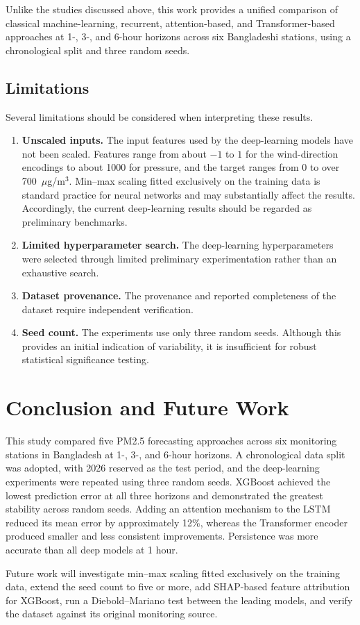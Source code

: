 \documentclass[conference]{IEEEtran}
\begin{document}
Unlike the studies discussed above, this work provides a unified comparison of classical machine-learning, recurrent, attention-based, and Transformer-based approaches at 1-, 3-, and 6-hour horizons across six Bangladeshi stations, using a chronological split and three random seeds.

\subsection{Limitations}\label{sec:limitations}
Several limitations should be considered when interpreting these results.

\begin{enumerate}
    \item \textbf{Unscaled inputs.} The input features used by the deep-learning models have not been scaled. Features range from about \(-1\) to \(1\) for the wind-direction encodings to about 1000 for pressure, and the target ranges from 0 to over 700~\(\mu\)g/m\(^3\). Min--max scaling fitted exclusively on the training data is standard practice for neural networks and may substantially affect the results. Accordingly, the current deep-learning results should be regarded as preliminary benchmarks.
    \item \textbf{Limited hyperparameter search.} The deep-learning hyperparameters were selected through limited preliminary experimentation rather than an exhaustive search.
    \item \textbf{Dataset provenance.} The provenance and reported completeness of the dataset require independent verification.
    \item \textbf{Seed count.} The experiments use only three random seeds. Although this provides an initial indication of variability, it is insufficient for robust statistical significance testing.
\end{enumerate}

\section{Conclusion and Future Work}
This study compared five PM2.5 forecasting approaches across six monitoring stations in Bangladesh at 1-, 3-, and 6-hour horizons. A chronological data split was adopted, with 2026 reserved as the test period, and the deep-learning experiments were repeated using three random seeds. XGBoost achieved the lowest prediction error at all three horizons and demonstrated the greatest stability across random seeds. Adding an attention mechanism to the LSTM reduced its mean error by approximately 12\%, whereas the Transformer encoder produced smaller and less consistent improvements. Persistence was more accurate than all deep models at 1 hour.

Future work will investigate min--max scaling fitted exclusively on the training data, extend the seed count to five or more, add SHAP-based feature attribution for XGBoost, run a Diebold--Mariano test between the leading models, and verify the dataset against its original monitoring source.



\end{document}
